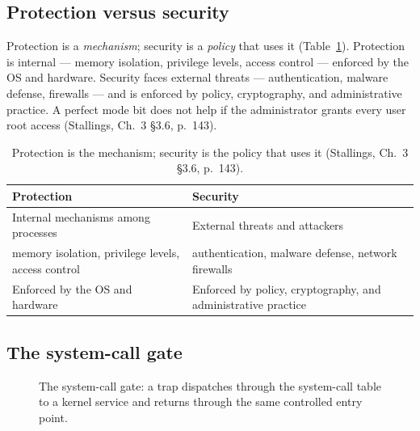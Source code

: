 \documentclass[11pt]{article}
\begin{document}
\subsection*{Protection versus security}

Protection is a \emph{mechanism}; security is a \emph{policy} that uses it (Table~\ref{tab:protection-security}). Protection is internal --- memory isolation, privilege levels, access control --- enforced by the OS and hardware. Security faces external threats --- authentication, malware defense, firewalls --- and is enforced by policy, cryptography, and administrative practice. A perfect mode bit does not help if the administrator grants every user root access (Stallings, Ch.~3 §3.6, p.~143).

\begin{table}[h]
\centering
\small
\renewcommand{\arraystretch}{1.4}
\begin{tabular}{p{}p{}}
\toprule
\textbf{Protection} & \textbf{Security} \\
\midrule
Internal mechanisms among processes & External threats and attackers \\
memory isolation, privilege levels, access control & authentication, malware defense, network firewalls \\
Enforced by the OS and hardware & Enforced by policy, cryptography, and administrative practice \\
\bottomrule
\end{tabular}
\caption{Protection is the mechanism; security is the policy that uses it (Stallings, Ch.~3 §3.6, p.~143).}
\label{tab:protection-security}
\end{table}

\subsection*{The system-call gate}

\begin{figure}[h]
  \centering
  \caption{The system-call gate: a trap dispatches through the system-call table to a kernel service and returns through the same controlled entry point.}
  \label{fig:syscall-gate}
\end{figure}
\end{document}
